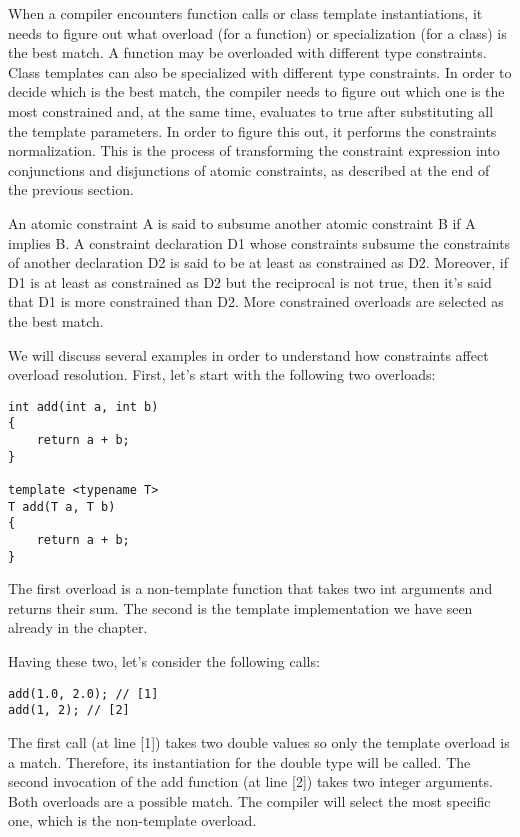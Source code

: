 When a compiler encounters function calls or class template instantiations, it needs to figure out what overload (for a function) or specialization (for a class) is the best match. A function may be overloaded with different type constraints. Class templates can also be specialized with different type constraints. In order to decide which is the best match, the compiler needs to figure out which one is the most constrained and, at the same time, evaluates to true after substituting all the template parameters. In order to figure this out, it performs the constraints normalization. This is the process of transforming the constraint expression into conjunctions and disjunctions of atomic constraints, as described at the end of the previous section.

An atomic constraint A is said to subsume another atomic constraint B if A implies B. A constraint declaration D1 whose constraints subsume the constraints of another declaration D2 is said to be at least as constrained as D2. Moreover, if D1 is at least as constrained as D2 but the reciprocal is not true, then it’s said that D1 is more constrained than D2. More constrained overloads are selected as the best match.

We will discuss several examples in order to understand how constraints affect overload resolution. First, let’s start with the following two overloads:

\begin{lstlisting}[style=styleCXX]
int add(int a, int b)
{
	return a + b;
}

template <typename T>
T add(T a, T b)
{
	return a + b;
}
\end{lstlisting}

The first overload is a non-template function that takes two int arguments and returns their sum. The second is the template implementation we have seen already in the chapter.

Having these two, let’s consider the following calls:

\begin{lstlisting}[style=styleCXX]
add(1.0, 2.0); // [1]
add(1, 2); // [2]
\end{lstlisting}

The first call (at line [1]) takes two double values so only the template overload is a match. Therefore, its instantiation for the double type will be called. The second invocation of the add function (at line [2]) takes two integer arguments. Both overloads are a possible match. The compiler will select the most specific one, which is the non-template overload.

